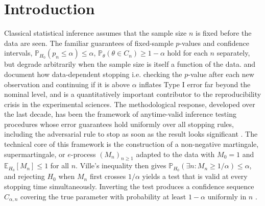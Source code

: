 \documentclass{article}%
\newcommand{\E}{\mathbb{E}}
\newcommand{\1}{\mathbf{1}}
\begin{document}
\section{Introduction}
\label{sec:intro}
Classical statistical inference assumes that the sample size \(n\) is
fixed before the data are seen. The familiar guarantees of fixed-sample
\(p\)-values and confidence intervals, \(\mathbb{P}_{H_0}(p_n \leq \alpha) \leq \alpha\), \(\mathbb{P}_\theta(\theta \in C_n) \geq 1-\alpha\) hold for each \(n\) separately, but degrade arbitrarily when the sample size is itself a function of the data. 
\cite{wagenmakers2007practical} and \cite{simmons2011false} document how
data-dependent stopping i.e. checking the \(p\)-value after each new
observation and continuing if it is above \(\alpha\) inflates Type I
error far beyond the nominal level, and is a quantitatively important
contributor to the reproducibility crisis in the experimental sciences.
The methodological response, developed over the last decade, has been the framework of anytime-valid inference testing procedures whose error
guarantees hold uniformly over all stopping rules, including the
adversarial rule to stop as soon as the result looks significant
\citep{Howard2021, grunwald2020safe, RamdasGrunwald2023}. The technical core of this framework is the construction of a non-negative martingale, supermartingale, or \(e\)-process \((M_n)_{n\geq 1}\) adapted to the data with \(M_0=1\) and \(\E_{H_0}[M_n]\leq 1\) for all \(n\). Ville's inequality \citep{ville1939etude} then gives \(\mathbb{P}_{H_0}(\exists n: M_n \geq 1/\alpha) \leq \alpha\), and rejecting \(H_0\) when \(M_n\) first crosses \(1/\alpha\) yields a test that is valid at every stopping time simultaneously. Inverting the test produces a confidence
sequence \(C_{\alpha,n}\) covering the true parameter with probability
at least \(1-\alpha\) uniformly in \(n\) \citep{Darling1967, Robbins1970, Lai1976}.
\end{document}

